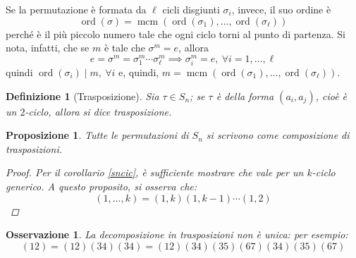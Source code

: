 \documentclass[11pt]{scrartcl}
\theoremstyle{style1}
\newtheorem{osservazione}{Osservazione}[section]
\newtheorem{prop}{Proposizione}[section]
\newtheorem{definizione}{Definizione}[section]
\numberwithin{equation}{subsection}
\begin{document}
Se la permutazione \`e formata da $\ell $ cicli disgiunti $\sigma _i$, invece, il suo ordine \`e 
\[
\operatorname{ord}(\sigma ) = \operatorname{mcm} (\operatorname{ord}(\sigma_1) , \ldots, \operatorname{ord}(\sigma _\ell ) )
\] 
perch\'e \`e il pi\`u piccolo numero tale che ogni ciclo torni al punto di partenza.
Si nota, infatti, che se $m$ \`e tale che $\sigma ^m = e$, allora
\[
	e = \sigma  ^m  = \sigma_1 ^m \cdots \sigma _\ell ^m \implies \sigma _i^m = e , \ \forall i=1,\ldots,\ell 
\] 
quindi $\operatorname{ord}(\sigma _i)  \mid m, \ \forall i$ e, quindi, $m=\operatorname{mcm} (\operatorname{ord}(\sigma _1) ,\ldots,\operatorname{ord}(\sigma _\ell ) )$.
\begin{definizione}
	[Trasposizione]
	Sia $\tau \in S_n$; se $\tau $ \`e della forma $(a_i,a_j)$, cio\`e \`e un $2$-ciclo, allora si dice \textit{trasposizione}.
\end{definizione}
\begin{prop}
	Tutte le permutazioni di $S_n$ si scrivono come composizione di trasposizioni. 
	\begin{proof}
		Per il corollario \ref{sncic}, \`e sufficiente mostrare che vale per un $k$-ciclo generico. 
		A questo proposito, si osserva che:
		\[
			(1,\ldots,k)= (1,k) (1,k-1)\cdots (1,2)
		\] 
	\end{proof}
\end{prop}
\begin{osservazione}
La decomposizione in trasposizioni non \`e unica: per esempio:
\[
	(12) = (12)(34)(34) = (12)(34)(35)(67)(34)(35)(67)
\] 
\end{osservazione}
\end{document}
